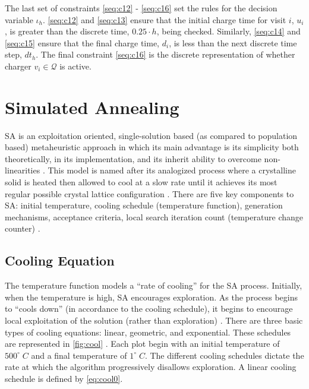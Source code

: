 \documentclass[11pt,a4paper,final]{article}
\newcommand{\Qset}{\mathcal{Q}}             %
\begin{document}
The last set of constraints \ref{seq:c12} - \ref{seq:c16} set the rules for the decision variable \(\iota_h\). \ref{seq:c12}
and \ref{seq:c13} ensure that the initial charge time for visit \(i\), \(u_i\), is greater than the discrete time, \(0.25 \cdot
h\), being checked. Similarly, \ref{seq:c14} and \ref{seq:c15} ensure that the final charge time, \(d_i\), is less than the
next discrete time step, \(dt_h\). The final constraint \ref{seq:c16} is the discrete representation of whether charger
\(v_i \in \Qset\) is active.
\section{Simulated Annealing}
\label{sec:simulated-annealing}
SA is an exploitation oriented, single-solution based (as compared to population based) metaheuristic approach in which
its main advantage is its simplicity both theoretically, in its implementation, and its inherit ability to overcome
non-linearities \cite{gendreau-2018-handb-metah,radosavljevic-2018-metah-optim}. This model is named after its
analogized process where a crystalline solid is heated then allowed to cool at a slow rate until it achieves its most
regular possible crystal lattice configuration \cite{henderson-1989-theor-pract}. There are five key components to SA:
initial temperature, cooling schedule (temperature function), generation mechanisms, acceptance criteria, local search
iteration count (temperature change counter) \cite{keller-2019-multi-objec}.

\subsection{Cooling Equation}
\label{cooling-equation-experimental}
The temperature function models a ``rate of cooling'' for the SA process. Initially, when the temperature is high, SA
encourages exploration. As the process begins to ``cools down'' (in accordance to the cooling schedule), it begins to
encourage local exploitation of the solution (rather than exploration)
\cite{rutenbar-1989-simul-anneal-algor,henderson-1989-theor-pract}. There are three basic types of cooling equations:
linear, geometric, and exponential. These schedules are represented in \ref{fig:cool} \cite{keller-2019-multi-objec}. Each
plot begin with an initial temperature of \(500^\circ\; C\) and a final temperature of \(1^\circ\; C\). The different
cooling schedules dictate the rate at which the algorithm progressively disallows exploration. A linear cooling schedule
is defined by \ref{eq:cool0}.
\end{document}
